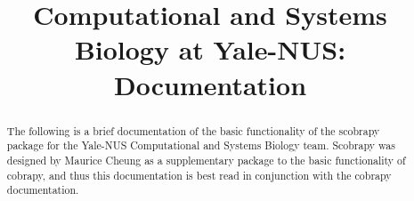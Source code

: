 \documentclass[12pt,a4paper,article, oneside]{memoir} %
\title{Computational and Systems Biology at Yale-NUS: Documentation}
\begin{document}
\maketitle

\begin{abstract}
The following is a brief documentation of the basic functionality of the scobrapy package for the Yale-NUS Computational and Systems Biology team. Scobrapy was designed by Maurice Cheung as a supplementary package to the basic functionality of cobrapy, and thus this documentation is best read in conjunction with the cobrapy documentation.
\end{abstract}

\clearpage
\tableofcontents* %

\clearpage





\end{document}
